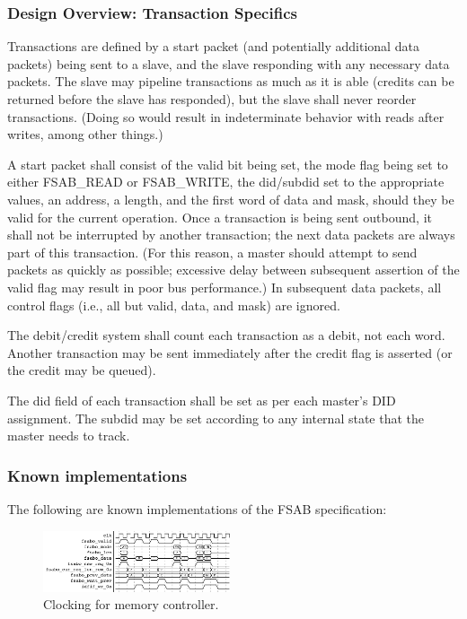 \documentclass[10pt,twocolumn]{article}
\begin{document}
\subsubsection{Design Overview: Transaction Specifics}

Transactions are defined by a start packet (and potentially additional data
packets) being sent to a slave, and the slave responding with any necessary
data packets. The slave may pipeline transactions as much as it is able
(credits can be returned before the slave has responded), but the slave
shall never reorder transactions. (Doing so would result in indeterminate
behavior with reads after writes, among other things.)

A start packet shall consist of the valid bit being set, the mode flag being
set to either FSAB\_READ or FSAB\_WRITE, the did/subdid set to the appropriate
values, an address, a length, and the first word of data and mask, should
they be valid for the current operation. Once a transaction is being sent
outbound, it shall not be interrupted by another transaction; the next data
packets are always part of this transaction. (For this reason, a master
should attempt to send packets as quickly as possible; excessive delay
between subsequent assertion of the valid flag may result in poor bus
performance.) In subsequent data packets, all control flags (i.e., all but
valid, data, and mask) are ignored.

The debit/credit system shall count each transaction as a debit, not each
word. Another transaction may be sent immediately after the credit flag is
asserted (or the credit may be queued).

The did field of each transaction shall be set as per each master's DID
assignment. The subdid may be set according to any internal state that the
master needs to track.


\subsubsection{Known implementations}

The following are known implementations of the FSAB specification:

\begin{figure}
  \centering
    \includegraphics[width=0.49\textwidth]{FSAB-IxFIF.pdf}
  \caption{Clocking for memory controller.} \label{mshim_clock}
\end{figure}
\end{document}
